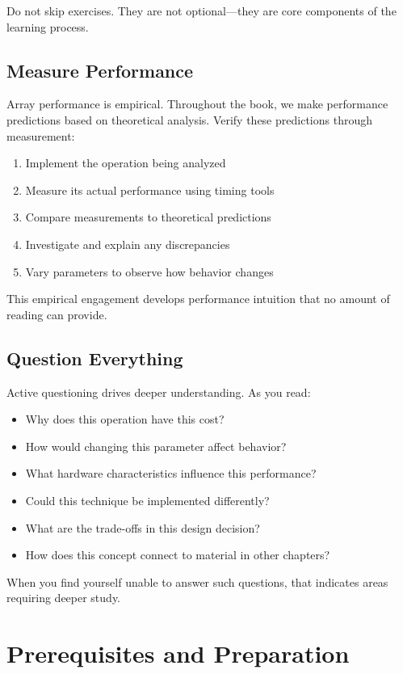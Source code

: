 Do not skip exercises. They are not optional—they are core components of the learning process.

\subsection*{Measure Performance}

Array performance is empirical. Throughout the book, we make performance predictions based on theoretical analysis. Verify these predictions through measurement:

\begin{enumerate}
    \item Implement the operation being analyzed
    \item Measure its actual performance using timing tools
    \item Compare measurements to theoretical predictions
    \item Investigate and explain any discrepancies
    \item Vary parameters to observe how behavior changes
\end{enumerate}

This empirical engagement develops performance intuition that no amount of reading can provide.

\subsection*{Question Everything}

Active questioning drives deeper understanding. As you read:

\begin{itemize}
    \item Why does this operation have this cost?
    \item How would changing this parameter affect behavior?
    \item What hardware characteristics influence this performance?
    \item Could this technique be implemented differently?
    \item What are the trade-offs in this design decision?
    \item How does this concept connect to material in other chapters?
\end{itemize}

When you find yourself unable to answer such questions, that indicates areas requiring deeper study.

\section*{Prerequisites and Preparation}

